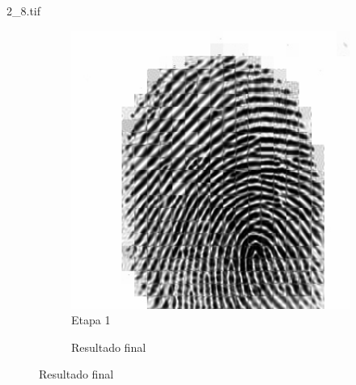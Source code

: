 \documentclass{beamer}
\begin{document}
\begin{frame}{2\_8.tif}
\begin{figure}
\begin{subfigure}[!ht]{0.32\textwidth}
                \includegraphics[width=\columnwidth]{Fingerprints/2_8_intermediate.jpg}
                \caption{Etapa 1}
            \end{subfigure}
            \begin{subfigure}[!ht]{0.32\textwidth}
                \caption{Resultado final}
            \end{subfigure}
        \end{figure}
    \end{frame}

\end{document}
